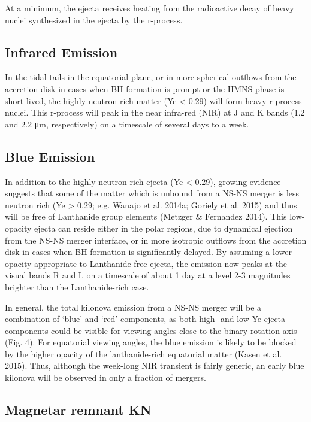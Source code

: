 At a minimum, the ejecta receives heating from the radioactive decay of heavy nuclei synthesized in the ejecta by the r-process.



\subsection{Infrared Emission}

In the tidal tails in the equatorial plane, or in more spherical outflows from the accretion disk in cases when BH formation is prompt or the HMNS phase is short-lived, the highly neutron-rich matter (Ye < 0.29) will form heavy r-process nuclei.
This r-process will peak in the near infra-red (NIR) at J and K bands (1.2 and 2.2 μm, respectively) on a timescale of several days to a week.

\subsection{Blue Emission}

In addition to the highly neutron-rich ejecta (Ye < 0.29), growing evidence suggests that some of the matter which is unbound from a NS-NS merger is less neutron rich (Ye > 0.29; e.g. Wanajo et al. 2014a; Goriely et al. 2015) and thus will be free of Lanthanide group elements (Metzger \& Fernandez 2014). This low-opacity ejecta can reside either in the polar regions, due to dynamical ejection from the NS-NS merger interface, or in more isotropic outflows from the accretion disk in cases when BH formation is significantly delayed.
By assuming a lower opacity appropriate to Lanthanide-free ejecta, the emission now peaks at the visual bands R and I, on a timescale of about 1 day at a level 2-3 magnitudes brighter than the Lanthanide-rich case.

In general, the total kilonova emission from a NS-NS merger will be a combination of `blue' and `red' components, as both high- and low-Ye ejecta components could be visible for viewing angles close to the binary rotation axis (Fig. 4). For equatorial viewing angles, the blue emission is likely to be blocked by the higher opacity of the lanthanide-rich equatorial matter (Kasen et al. 2015). Thus, although the week-long NIR transient is fairly generic, an early blue kilonova will be observed in only a fraction of mergers.

\subsection{Magnetar remnant KN}

